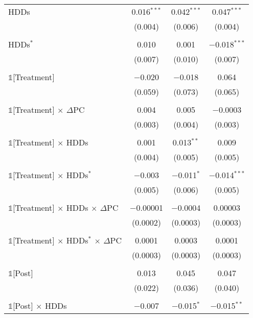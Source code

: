 {\begin{table}[t!]
\begin{ThreePartTable}
\begin{longtable}{@{\extracolsep{45pt}}lccc}
                HDDs & 0.016$^{***}$ & 0.042$^{***}$ & 0.047$^{***}$ \\
                & (0.004) & (0.006) & (0.004) \\
                & & & \\
                HDDs$^{*}$ & 0.010 & 0.001 & $-$0.018$^{***}$ \\
                & (0.007) & (0.010) & (0.007) \\
                & & & \\
                $\mathbb{1}$[Treatment] & $-$0.020 & $-$0.018 & 0.064 \\
                & (0.059) & (0.073) & (0.065) \\
                & & & \\
                $\mathbb{1}$[Treatment] $\times$ $\Delta$PC & 0.004 & 0.005 & $-$0.0003 \\
                & (0.003) & (0.004) & (0.003) \\
                & & & \\
                $\mathbb{1}$[Treatment] $\times$ HDDs & 0.001 & 0.013$^{**}$ & 0.009 \\
                & (0.004) & (0.005) & (0.005) \\
                & & & \\
                $\mathbb{1}$[Treatment] $\times$ HDDs$^{*}$ & $-$0.003 & $-$0.011$^{*}$ & $-$0.014$^{***}$ \\
                & (0.005) & (0.006) & (0.005) \\
                & & & \\
                $\mathbb{1}$[Treatment] $\times$ HDDs $\times$ $\Delta$PC & $-$0.00001 & $-$0.0004 & 0.00003 \\
                & (0.0002) & (0.0003) & (0.0003) \\
                & & & \\
                $\mathbb{1}$[Treatment] $\times$ HDDs$^{*}$ $\times$ $\Delta$PC & 0.0001 & 0.0003 & 0.0001 \\
                & (0.0003) & (0.0003) & (0.0003) \\
                & & & \\
                $\mathbb{1}$[Post] & 0.013 & 0.045 & 0.047 \\
                & (0.022) & (0.036) & (0.040) \\
                & & & \\
                $\mathbb{1}$[Post] $\times$ HDDs & $-$0.007 & $-$0.015$^{*}$ & $-$0.015$^{**}$ \\

\end{longtable}
\end{ThreePartTable}
\end{table}}

